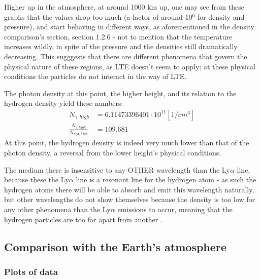 \documentclass[11pt,a4paper,notitlepage]{article}
\begin{document}
Higher up in the atmosphere, at around 1000 km up, one may see from these graphs that the values drop too much (a factor of around 10$^6$ for density and pressure), and start behaving in different ways, as aforementioned in the density comparison's section, section 1.2.6 - not to mention that the temperature increases wildly, in spite of the pressure and the densities still dramatically decreasing. This sugggests that there are different phenomena that govern the physical nature of these regions, as LTE doesn't seem to apply; at these physical conditions the particles do not interact in the way of LTE.

The photon density at this point, the higher height, and its relation to the hydrogen density yield these numbers:
\begin{align*}
N_{\gamma,high} &= 6.11473396401 \cdot 10^{11} [1/cm^3]\\
\frac{N_{\gamma,high}}{N_{hyd,high}} &= 109.681
\end{align*}
At this point, the hydrogen density is indeed very much lower than that of the photon density, a reversal from the lower height's physical conditions.

The medium there is insensitive to any OTHER wavelength than the Ly$\alpha$ line, because these the Ly$\alpha$ line is a resonant line for the hydrogen atom - as such the hydrogen atoms there will be able to absorb and emit this wavelength naturally, but other wavelengths do not show themselves because the density is too low for any other phenomena than the Ly$\alpha$ emissions to occur, meaning that the hydrogen particles are too far apart from another .


\subsection{Comparison with the Earth's atmosphere}
\subsubsection{Plots of data}
\end{document}
